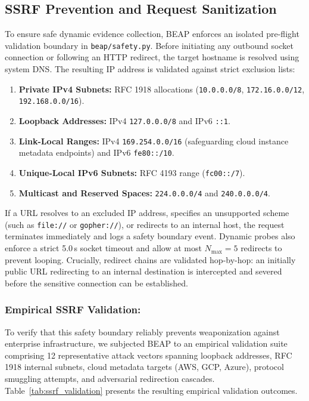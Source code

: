 \documentclass[conference]{IEEEtran}
\begin{document}
\subsection{SSRF Prevention and Request Sanitization}\label{ssrf-safety}

To ensure safe dynamic evidence collection, BEAP enforces an isolated pre-flight validation boundary in \texttt{beap/safety.py}. Before initiating any outbound socket connection or following an HTTP redirect, the target hostname is resolved using system DNS. The resulting IP address is validated against strict exclusion lists:
\begin{enumerate}[leftmargin=2.5em]
    \item \textbf{Private IPv4 Subnets:} RFC 1918 allocations (\texttt{10.0.0.0/8}, \texttt{172.16.0.0/12}, \texttt{192.168.0.0/16}).
    \item \textbf{Loopback Addresses:} IPv4 \texttt{127.0.0.0/8} and IPv6 \texttt{::1}.
    \item \textbf{Link-Local Ranges:} IPv4 \texttt{169.254.0.0/16} (safeguarding cloud instance metadata endpoints) and IPv6 \texttt{fe80::/10}.
    \item \textbf{Unique-Local IPv6 Subnets:} RFC 4193 range (\texttt{fc00::/7}).
    \item \textbf{Multicast and Reserved Spaces:} \texttt{224.0.0.0/4} and \texttt{240.0.0.0/4}.
\end{enumerate}
If a URL resolves to an excluded IP address, specifies an unsupported scheme (such as \texttt{file://} or \texttt{gopher://}), or redirects to an internal host, the request terminates immediately and logs a safety boundary event. Dynamic probes also enforce a strict 5.0\,s socket timeout and allow at most $N_{\text{max}} = 5$ redirects to prevent looping. Crucially, redirect chains are validated hop-by-hop: an initially public URL redirecting to an internal destination is intercepted and severed before the sensitive connection can be established.

\subsubsection{Empirical SSRF Validation:}\label{ssrf-empirical-validation}
To verify that this safety boundary reliably prevents weaponization against enterprise infrastructure, we subjected BEAP to an empirical validation suite comprising 12 representative attack vectors spanning loopback addresses, RFC 1918 internal subnets, cloud metadata targets (AWS, GCP, Azure), protocol smuggling attempts, and adversarial redirection cascades. Table~\ref{tab:ssrf_validation} presents the resulting empirical validation outcomes.
\end{document}
